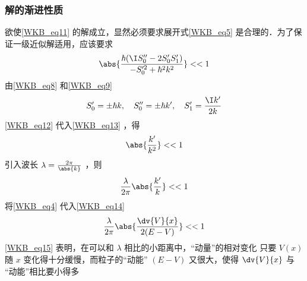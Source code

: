 \subsubsection{解的渐进性质}
欲使\autoref{WKB_eq11} 的解成立，显然必须要求展开式\autoref{WKB_eq5} 是合理的．为了保证一级近似解适用，应该要求
\begin{equation}\label{WKB_eq13}
\abs{\frac{\hbar(\I S_0''-2S_0'S_1')}{-S_0'^2+\hbar^2k^2}}<<1
\end{equation}
由\autoref{WKB_eq8} 和\autoref{WKB_eq9} 
\begin{equation}\label{WKB_eq12}
S_0'=\pm\hbar k,\quad S_0''=\pm\hbar k',\quad S_1'=\frac{\I k'}{2k}
\end{equation}
\autoref{WKB_eq12} 代入\autoref{WKB_eq13} ，得
\begin{equation}
\abs{\frac{k'}{k^2}}<<1
\end{equation}
引入波长 $\lambda=\frac{2\pi}{\abs{k}}$ ，则
\begin{equation}\label{WKB_eq14}
\frac{\lambda}{2\pi}\abs{\frac{k'}{k}}<<1
\end{equation}
将\autoref{WKB_eq4} 代入\autoref{WKB_eq14} 
\begin{equation}\label{WKB_eq15}
\frac{\lambda}{2\pi}\abs{\frac{\dv{V}{x}}{2(E-V)}}<<1
\end{equation}
\autoref{WKB_eq15} 表明，在可以和 $\lambda$ 相比的小距离中，“动量”的相对变化 只要 $V(x)$ 随 $x$ 变化得十分缓慢，而粒子的“动能” $(E-V)$ 又很大，使得 $\dv{V}{x}$ 与 “动能”相比要小得多
